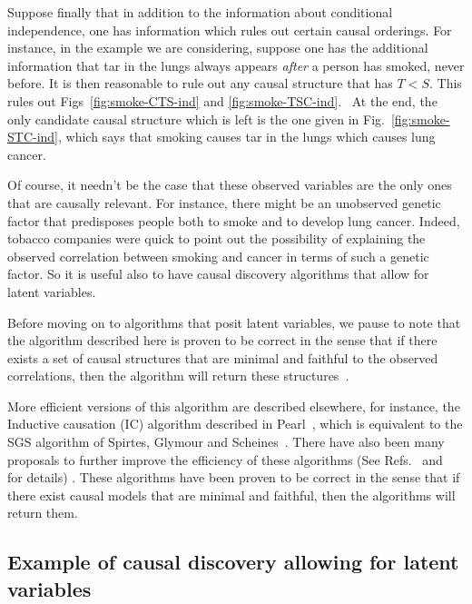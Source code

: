 \documentclass[letterpaper,onecolumn,nofootinbib]{revtex4}
\begin{document}
Suppose finally that in addition to the information about conditional
independence, one has information which rules out certain causal orderings.
For instance, in the example we are considering, suppose one has the
additional information that tar in the lungs always appears \emph{after} a
person has smoked, never before. It is then reasonable to rule out any
causal structure that has $T<S.$ This rules out Figs~\ref{fig:smoke-CTS-ind} and \ref{fig:smoke-TSC-ind}. \ At the end, the only candidate causal structure which is left is the one given in Fig.~\ref{fig:smoke-STC-ind}, which says that smoking causes tar in the lungs which causes lung cancer.

Of course, it needn't be the case that these observed variables are the only
ones that are causally relevant. For instance, there might be an unobserved genetic
factor that predisposes people both to smoke and to
develop lung cancer. Indeed, tobacco companies were quick to point out the possibility of
explaining the observed correlation between smoking and cancer in terms of
such a genetic factor. So it is useful also to have causal discovery
algorithms that allow for latent variables.

Before moving on to algorithms that posit latent variables, we pause to note
that the algorithm described here is proven to be correct in the sense
that if there exists a set of causal structures that are minimal and
faithful to the observed correlations, then the algorithm will return these structures~\cite{Wermuth1983}.


More efficient versions of this algorithm are described elsewhere, for
instance, the Inductive causation (IC) algorithm described in Pearl~\cite{Pearl2009}, which is equivalent to the SGS algorithm of Spirtes, Glymour and Scheines~\cite{Spirtes2001}. There have also been many proposals to further improve the efficiency of these algorithms (See Refs.~\cite{Pearl2009} and~\cite{Spirtes2001} for details) .  These algorithms have been proven to be correct in the sense that if there exist causal models that are minimal and faithful, then the algorithms will return them.


\subsection{Example of causal discovery allowing for latent variables}
\label{sec:causal-hvar}
\end{document}
